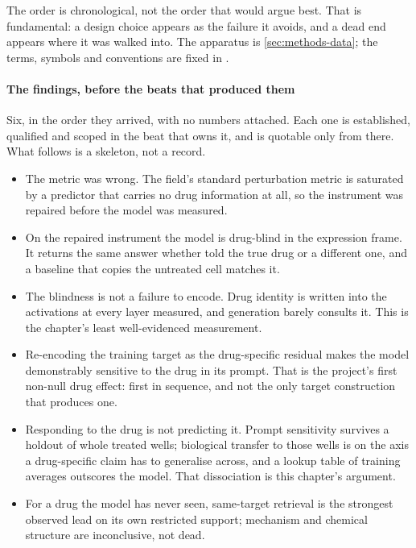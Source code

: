 \noindent
The order is chronological, not the order that would argue best. That is
fundamental: a design choice appears as the failure it avoids, and a dead end
appears where it was walked into. The apparatus is \cref{sec:methods-data}; the
terms, symbols and conventions are fixed in .

\paragraph{The findings, before the beats that produced them} Six, in the order
they arrived, with no numbers attached. Each one is established, qualified and
scoped in the beat that owns it, and is quotable only from there. What follows
is a skeleton, not a record.

\begin{itemize}
\item The metric was wrong. The field's standard perturbation metric is saturated
  by a predictor that carries no drug information at all, so the instrument was
  repaired before the model was measured.
\item On the repaired instrument the model is drug-blind in the expression
  frame. It returns the same answer whether told the true drug or a different
  one, and a baseline that copies the untreated cell matches it.
\item The blindness is not a failure to encode. Drug identity is written into
  the activations at every layer measured, and generation barely consults it.
  This is the chapter's least well-evidenced measurement.
\item Re-encoding the training target as the drug-specific residual makes the
  model demonstrably sensitive to the drug in its prompt. That is the project's
  first non-null drug effect: first in sequence, and not the only target
  construction that produces one.
\item Responding to the drug is not predicting it. Prompt sensitivity survives a
  holdout of whole treated wells; biological transfer to those wells is
  \notestablished on the axis a drug-specific claim has to generalise across, and
  a lookup table of training averages outscores the model. That dissociation is
  this chapter's argument.
\item For a drug the model has never seen, same-target retrieval is the
  strongest observed lead on its own restricted support; mechanism and chemical
  structure are inconclusive, not dead.
\end{itemize}

